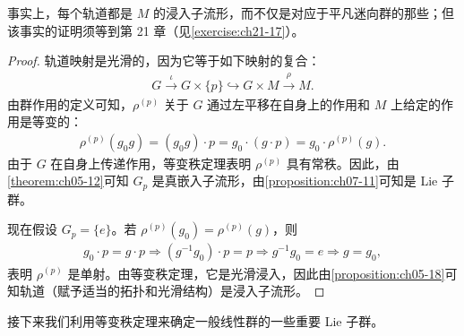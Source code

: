 \documentclass[../../main.tex]{subfiles}
\begin{document}
\begin{remark}
事实上，每个轨道都是 $M$ 的浸入子流形，而不仅是对应于平凡迷向群的那些；但该事实的证明须等到第 21 章（见\cref{exercise:ch21-17}）。
\end{remark}

\begin{proof}
轨道映射是光滑的，因为它等于如下映射的复合：
\begin{align*}
G\xrightarrow{\iota}G\times\{p\}\hookrightarrow G\times M\xrightarrow{\rho}M.
\end{align*}
由群作用的定义可知，$\rho^{(p)}$ 关于 $G$ 通过左平移在自身上的作用和 $M$ 上给定的作用是等变的：
\begin{align*}
\rho^{(p)}(g_0g)=(g_0g)\cdot p=g_0\cdot(g\cdot p)=g_0\cdot\rho^{(p)}(g).
\end{align*}
由于 $G$ 在自身上传递作用，等变秩定理表明 $\rho^{(p)}$ 具有常秩。因此，由\cref{theorem:ch05-12}可知 $G_p$ 是真嵌入子流形，由\cref{proposition:ch07-11}可知是 Lie 子群。

现在假设 $G_p=\{e\}$。若 $\rho^{(p)}(g_0)=\rho^{(p)}(g)$，则
\begin{align*}
g_0\cdot p=g\cdot p\Rightarrow(g^{-1}g_0)\cdot p=p\Rightarrow g^{-1}g_0=e\Rightarrow g=g_0,
\end{align*}
表明 $\rho^{(p)}$ 是单射。由等变秩定理，它是光滑浸入，因此由\cref{proposition:ch05-18}可知轨道（赋予适当的拓扑和光滑结构）是浸入子流形。
\end{proof}

接下来我们利用等变秩定理来确定一般线性群的一些重要 Lie 子群。
\end{document}
